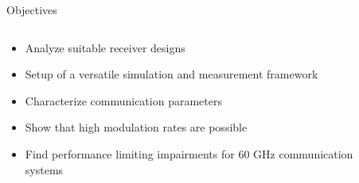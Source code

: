 \documentclass[10pt]{beamer}
\newcommand*{\ClipSep}{0.3cm}%
\begin{document}
\begin{frame}{Objectives}
  \begin{columns}[T]
    \begin{column}{.6\textwidth}
      \begin{itemize}
      \item Analyze suitable receiver designs
      \item Setup of a versatile simulation and measurement framework
      \item Characterize communication parameters
      \item Show that high modulation rates are possible
      \item Find performance limiting impairments for 60 GHz communication systems
      \end{itemize}
    \end{column}
    \begin{column}{.4\textwidth}
    \end{column}
  \end{columns}
\end{frame}
\end{document}

